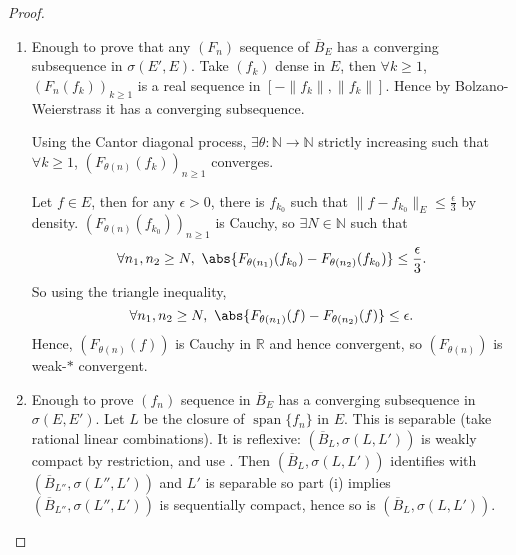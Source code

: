 \documentclass[twoside]{article}
\DeclareMathOperator{\spn}{span}
\begin{document}
\begin{proof}\leavevmode
    \begin{enumerate}[label=(\roman*)]
      \item Enough to prove that any $(F_n)$ sequence of $\overline{B}_E$ has a converging subsequence in $\sigma(E', E)$.
        Take $(f_k)$ dense in $E$, then $\forall k \geq 1$, $(F_n(f_k))_{k \geq 1}$ is a real sequence in $[-\|f_k\|,\|f_k\|]$.
        Hence by Bolzano-Weierstrass it has a converging subsequence.

        Using the Cantor diagonal process, $\exists \theta:\mathbb{N} \to \mathbb{N}$ strictly increasing such that $\forall k \geq 1$, $(F_{\theta(n)}(f_k))_{n \geq 1}$ converges.

        Let $f \in E$, then for any $\epsilon > 0$, there is $f_{k_0}$ such that $\|f - f_{k_0}\|_E \leq \frac{\epsilon}{3}$ by density.
        $(F_{\theta(n)}(f_{k_0}))_{n \geq 1}$ is Cauchy, so $\exists N \in \mathbb{N}$ such that
        \begin{equation*}
          \forall n_1, n_2 \geq N, \ \abs{F_{\theta(n_1)}(f_{k_0}) - F_{\theta(n_2)}(f_{k_0})} \leq \frac{\epsilon}{3}.
        \end{equation*}
        So using the triangle inequality,
        \begin{equation*}
          \forall n_1, n_2 \geq N, \ \abs{F_{\theta(n_1)}(f) - F_{\theta(n_2)}(f)} \leq \epsilon.
        \end{equation*}
        Hence, $(F_{\theta(n)}(f))$ is Cauchy in $\mathbb{R}$ and hence convergent, so $(F_{\theta(n)})$ is weak-$*$ convergent.
        \item Enough to prove $(f_n)$ sequence in $\overline{B}_E$ has a converging subsequence in $\sigma(E, E')$.
            Let $L$ be the closure of $\spn\{f_n\}$ in $E$. This is separable (take rational linear combinations).
            It is reflexive: $(\overline{B}_L, \sigma(L, L'))$ is weakly compact by restriction, and use .
            Then $(\overline{B}_L, \sigma(L, L'))$ identifies with $(\overline{B}_{L''}, \sigma(L'', L'))$ and $L'$ is separable so part (i) implies $(\overline{B}_{L''}, \sigma(L'', L'))$ is sequentially compact, hence so is $(\overline{B}_L, \sigma(L, L'))$.
    \end{enumerate}
\end{proof}
\end{document}
